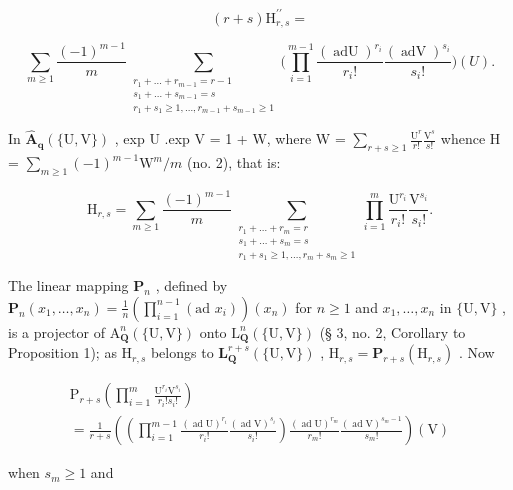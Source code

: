 \[
(r + s) \mathrm{H} _ {r, s} ^ {\prime \prime} = \tag {10}
\]

\[
\sum_{m\geqslant 1}\frac{(-1)^{m - 1}}{m}\sum_{\substack{r_{1} + \dots +r_{m - 1} = r - 1\\ s_{1} + \dots +s_{m - 1} = s\\ r_{1} + s_{1}\geqslant 1,\dots ,r_{m - 1} + s_{m - 1}\geqslant 1}}\Bigg(\prod_{i = 1}^{m - 1}\frac{(\operatorname{adU})^{r_{i}}}{r_{i}!}\frac{(\operatorname{adV})^{s_{i}}}{s_{i}!}\Bigg)(U).
\]

In \(\hat{\mathbf{A}}_{\mathbf{q}}(\{\mathrm{U},\mathrm{V}\})\) , exp U .exp V = 1 + W, where W = \(\sum_{r+s\geqslant 1}\frac{\mathrm{U}^r}{r!}\frac{\mathrm{V}^s}{s!}\) whence H = \(\sum_{m\geqslant 1}(-1)^{m - 1}\mathrm{W}^m /m\) (no. 2), that is:

\[
\mathrm{H}_{r,s} = \sum_{m\geqslant 1}\frac{(-1)^{m - 1}}{m}\sum_{\substack{r_{1} + \dots +r_{m} = r\\ s_{1} + \dots +s_{m} = s\\ r_{1} + s_{1}\geqslant 1,\ldots ,r_{m} + s_{m}\geqslant 1}}\prod_{i = 1}^{m}\frac{\mathrm{U}^{r_{i}}}{r_{i}!}\frac{\mathrm{V}^{s_{i}}}{s_{i}!}.\tag{11}
\]

The linear mapping \(\mathbf{P}_n\) , defined by \(\mathbf{P}_n(x_1, \ldots, x_n) = \frac{1}{n} \left( \prod_{i=1}^{n-1} (\text{ad } x_i) \right)(x_n)\) for \(n \geqslant 1\) and \(x_1, \ldots, x_n\) in \(\{\mathrm{U}, \mathrm{V}\}\) , is a projector of \(\mathrm{A}_{\mathbf{Q}}^n(\{\mathrm{U}, \mathrm{V}\})\) onto \(\mathrm{L}_{\mathbf{Q}}^n(\{\mathrm{U}, \mathrm{V}\})\) (§ 3, no. 2, Corollary to Proposition 1); as \(\mathrm{H}_{r,s}\) belongs to \(\mathbf{L}_{\mathbf{Q}}^{r+s}(\{\mathrm{U}, \mathrm{V}\})\) , \(\mathrm{H}_{r,s} = \mathbf{P}_{r+s}(\mathrm{H}_{r,s})\) . Now

\[
\begin{array}{l} \mathrm{P} _ {r + s} \left(\prod_ {i = 1} ^ {m} \frac {\mathrm{U} ^ {r _ {i}} \mathrm{V} ^ {s _ {i}}}{r _ {i} ! s _ {i} !}\right) \\ = \frac {1}{r + s} \left(\left(\prod_ {i = 1} ^ {m - 1} \frac {(\operatorname{ad} \mathrm{U}) ^ {r _ {i}}}{r _ {i} !} \frac {(\operatorname{ad} \mathrm{V}) ^ {s _ {i}}}{s _ {i} !}\right) \frac {(\operatorname{ad} \mathrm{U}) ^ {r _ {m}}}{r _ {m} !} \frac {(\operatorname{ad} \mathrm{V}) ^ {s _ {m} - 1}}{s _ {m} !}\right) (\mathrm{V}) \end{array}\tag{12}
\]

when \(s_m \geqslant 1\) and

